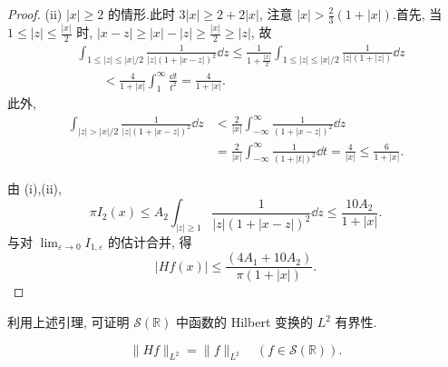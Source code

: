 \begin{proof}
(ii) $|x| \geq 2$ 的情形.此时 $3|x| \geq 2 + 2|x|$, 注意 $|x| > \frac{2}{3}(1 + |x|)$.首先, 当 $1 \leq |z| \leq \frac{|x|}{2}$ 时, $|x - z| \geq |x| - |z| \geq \frac{|x|}{2} \geq |z|$, 故
\begin{align*}
& \int_{1 \leq |z| \leq |x|/2}\frac{1}{|z|(1 + |x - z|)^{2}}\dd z \leq \frac{1}{1 + \frac{|x|}{2}}\int_{1 \leq |z| \leq |x|/2}\frac{1}{|z|(1 + |z|)}\dd z \\
& \qquad < \frac{4}{1 + |x|}\int_{1}^{\infty}\frac{\dd t}{t^{2}} = \frac{4}{1 + |x|}.
\end{align*}
此外, 
\begin{align*}
\int_{|z| > |x|/2}\frac{1}{|z|(1 + |x - z|)^{2}}\dd z & < \frac{2}{|x|}\int_{-\infty}^{\infty}\frac{1}{(1 + |x - z|)^{2}}\dd z \\
& = \frac{2}{|x|}\int_{-\infty}^{\infty}\frac{1}{(1 + |t|)^{2}}\dd t = \frac{4}{|x|} \leq \frac{6}{1 + |x|}.
\end{align*}

由 (i),(ii), 
\begin{equation*}
\pi I_{2}(x) \leq A_{2}\int_{|z| \geq 1}\frac{1}{|z|(1 + |x - z|)^{2}}\dd z \leq \frac{10A_{2}}{1 + |x|}.
\end{equation*}
与对 $\lim_{\varepsilon \to 0}I_{1,\varepsilon}$ 的估计合并, 得
\begin{equation*}
|Hf(x)| \leq \frac{(4A_{1} + 10A_{2})}{\pi(1 + |x|)}.
\end{equation*}
\end{proof}

利用上述引理, 可证明 $\mathcal{S}(\mathbb{R})$ 中函数的 Hilbert 变换的 $L^{2}$ 有界性.

\begin{theorem}\label{thm:1.3.3}
\begin{equation*}
\| Hf \|_{L^{2}} = \| f \|_{L^{2}} \quad (f \in \mathcal{S}(\mathbb{R})).
\end{equation*}
\end{theorem}

